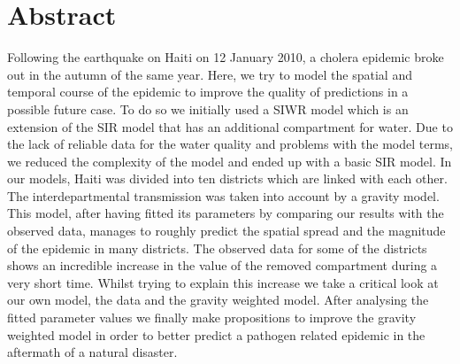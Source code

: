 \documentclass[11pt]{article}
\begin{document}






\section*{Abstract}
Following the earthquake on Haiti on 12 January 2010, a cholera epidemic broke out in the autumn of the same year. Here, we try to model the spatial and temporal course of the epidemic to improve the quality of predictions in a possible future case. To do so we initially used a SIWR model which is an extension of the SIR model that has an additional compartment for water. Due to the lack of reliable data for the water quality and problems with the model terms, we reduced the complexity of the model and ended up with a basic SIR model. In our models, Haiti was divided into ten districts which are linked with each other. The interdepartmental transmission was taken into account by a gravity model. This model, after having fitted its parameters by comparing our results with the observed data, manages to roughly predict the  spatial spread and the magnitude of the epidemic in many districts. The observed data for some of the districts shows an incredible increase in the value of the removed compartment during a very short time.
Whilst trying to explain this increase we take a critical look at our own model, the data and the gravity weighted model. After analysing the fitted parameter values we finally make propositions to improve the gravity weighted model in order to better predict a pathogen related epidemic in the aftermath of a natural disaster. 



\newpage


\tableofcontents

\newpage

\end{document}
